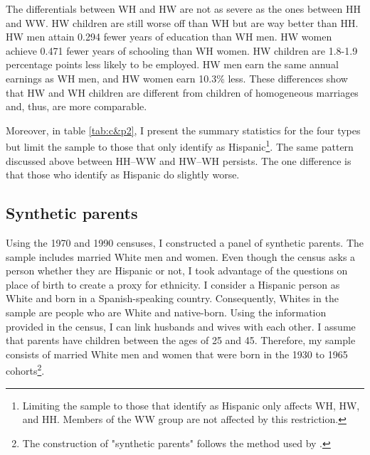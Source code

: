 \documentclass[12pt, fullpage]{article}
\begin{document}
The differentials between WH and HW are not as severe as the ones between HH and WW. HW children are still worse off than WH but are way better than HH. HW men attain 0.294 fewer years of education than WH men. HW women achieve 0.471 fewer years of schooling than WH women. HW children are 1.8-1.9 percentage points less likely to be employed. HW men earn the same annual earnings as WH men, and HW women earn 10.3\% less. These differences show that HW and WH children are different from children of homogeneous marriages and, thus, are more comparable.

Moreover, in table \ref{tab:c&p2}, I present the summary statistics for the four types but limit the sample to those that only identify as Hispanic\footnote{Limiting the sample to those that identify as Hispanic only affects WH, HW, and HH. Members of the WW group are not affected by this restriction.}. The same pattern discussed above between HH--WW and HW--WH persists. The one difference is that those who identify as Hispanic do slightly worse.
 
\subsection{Synthetic parents}

Using the 1970 and 1990 censuses, I constructed a panel of synthetic parents. The sample includes married White men and women. Even though the census asks a person whether they are Hispanic or not, I took advantage of the questions on place of birth to create a proxy for ethnicity. I consider a Hispanic person as White and born in a Spanish-speaking country. Consequently, Whites in the sample are people who are White and native-born. Using the information provided in the census, I can link husbands and wives with each other. I assume that parents have children between the ages of 25 and 45. Therefore, my sample consists of married White men and women that were born in the 1930 to 1965 cohorts\footnote{The construction of "synthetic parents" follows the method used by \citet{rubinstein2014pride}.}.
\end{document}
